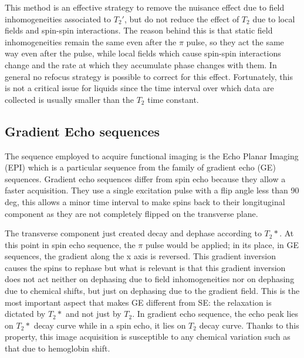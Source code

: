 \documentclass[11pt]{report}
\begin{document}
This method is an effective strategy to remove the nuisance effect due to field inhomogeneities associated to $T_2'$, but do not reduce the effect of $T_2$ due to local fields and spin-spin interactions. The reason behind this is that static field inhomogeneities remain the same even after the $\pi$ pulse, so they act the same way even after the pulse, while local fields which cause spin-spin interactions change and the rate at which they accumulate phase changes with them. In general no refocus strategy is possible to correct for this effect.
Fortunately, this is not a critical issue for liquids since the time interval over which data are collected is usually smaller than the $T_2$ time constant.



\subsection{Gradient Echo sequences}
The sequence employed to acquire functional imaging is the Echo Planar Imaging (EPI) which is a particular sequence from the family of gradient echo (GE) sequences.
Gradient echo sequences differ from spin echo because they allow a faster acquisition.
They use a single excitation pulse with a flip angle less than 90 deg, this allows a minor time interval to make spins back to their longituginal component as they are not completely flipped on the transverse plane.

The transverse component just created decay and dephase according to $T_2*$.
At this point in spin echo sequence, the $\pi$ pulse would be applied; in its place, in GE sequences, the gradient along the x axis is reversed.
This gradient inversion causes the spins to rephase but what is relevant is that this gradient inversion does not act neither on dephasing due to field inhomogeneities nor on dephasing due to chemical shifts, but just on dephasing due to the gradient field.
This is the most important aspect that makes GE different from SE: the relaxation is dictated by $T_2*$ and not just by $T_2$.
In gradient echo sequence, the echo peak lies on $T_2*$ decay curve while in a spin echo, it lies on $T_2$ decay curve.
Thanks to this property, this image acquisition is susceptible to any chemical variation such as that due to hemoglobin shift.
\end{document}
